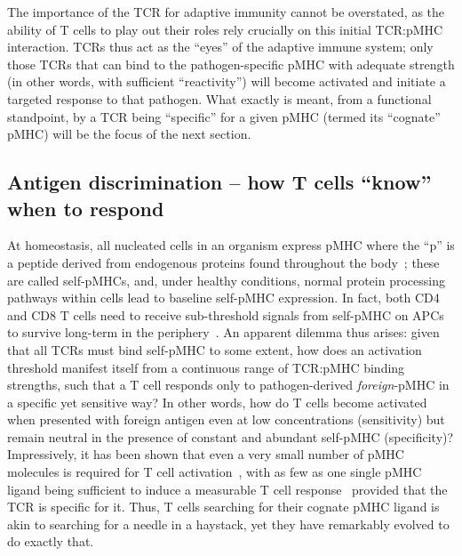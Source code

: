 The importance of the TCR for adaptive immunity cannot be overstated, as the ability of T cells to play out their roles rely crucially on this initial TCR:pMHC interaction. TCRs thus act as the ``eyes'' of the adaptive immune system; only those TCRs that can bind to the pathogen-specific pMHC with adequate strength (in other words, with sufficient ``reactivity'') will become activated and initiate a targeted response to that pathogen. What exactly is meant, from a functional standpoint, by a TCR being ``specific'' for a given pMHC (termed its ``cognate'' pMHC) will be the focus of the next section.

\subsection{Antigen discrimination -- how T cells ``know'' when to respond}
\label{sec:intro_overview_antigenDiscrimination}

At homeostasis, all nucleated cells in an organism express pMHC where the ``p'' is a peptide derived from endogenous proteins found throughout the body~\cite{hewitt2003mhc,van2011expression,rock2016present}; these are called self-pMHCs, and, under healthy conditions, normal protein processing pathways within cells lead to baseline self-pMHC expression. In fact, both CD4\pos{} and CD8\pos{} T cells need to receive sub-threshold signals from self-pMHC on APCs to survive long-term in the periphery~\cite{takeda1996mhc,brocker1997survival,kirberg1997peripheral,tanchot1997differential}. An apparent dilemma thus arises: given that all TCRs must bind self-pMHC to some extent, how does an activation threshold manifest itself from a continuous range of TCR:pMHC binding strengths, such that a T cell responds only to pathogen-derived \textit{foreign}-pMHC in a specific yet sensitive way? In other words, how do T cells become activated when presented with foreign antigen even at low concentrations (sensitivity) but remain neutral in the presence of constant and abundant self-pMHC (specificity)? Impressively, it has been shown that even a very small number of pMHC molecules is required for T cell activation~\cite{irvine2002direct}, with as few as one single pMHC ligand being sufficient to induce a measurable T cell response~\cite{huang2013single} provided that the TCR is specific for it. Thus, T cells searching for their cognate pMHC ligand is akin to searching for a needle in a haystack, yet they have remarkably evolved to do exactly that.

